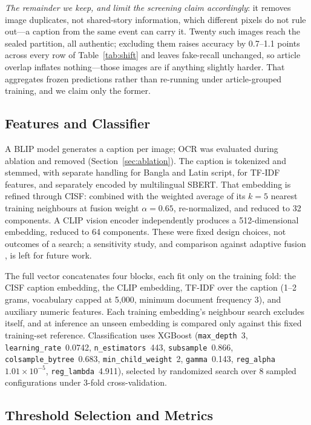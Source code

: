 \documentclass[conference,a4paper]{IEEEtran}
\begin{document}
\emph{The remainder we keep, and limit the screening claim accordingly}: it
removes image duplicates, not shared-story information, which different pixels
do not rule out---a caption from the same event can carry it. Twenty such
images reach the sealed partition, all authentic; excluding them raises
accuracy by 0.7--1.1 points across every row of Table~\ref{tab:shift} and
leaves fake-recall unchanged, so article overlap inflates nothing---those
images are if anything slightly harder. That aggregates frozen predictions
rather than re-running under article-grouped training, and we claim only the
former.

\subsection{Features and Classifier}
\label{sec:features}

A BLIP model generates a caption per image; OCR was evaluated during ablation
and removed (Section~\ref{sec:ablation}). The caption is tokenized and stemmed,
with separate handling for Bangla and Latin script, for TF-IDF features, and
separately encoded by multilingual SBERT. That embedding is refined through
CISF: combined with the weighted average of its $k=5$ nearest training
neighbours at fusion weight $\alpha=0.65$, re-normalized, and reduced to 32
components. A CLIP vision encoder independently produces a
512-dimensional embedding, reduced to 64 components. These were fixed design
choices, not outcomes of a search; a sensitivity study, and comparison against
adaptive fusion \cite{mmfusionnet,claaf}, is left for future work.

The full vector concatenates four blocks, each fit only on the training fold:
the CISF caption embedding, the CLIP embedding, TF-IDF over the caption (1--2
grams, vocabulary capped at 5{,}000, minimum document frequency 3), and
auxiliary numeric features. Each training embedding's neighbour search excludes
itself, and at inference an unseen embedding is compared only against this
fixed training-set reference. Classification uses XGBoost
(\texttt{max\_depth}~3, \texttt{learning\_rate}~0.0742,
\texttt{n\_estimators}~443, \texttt{subsample}~0.866,
\texttt{colsample\_bytree}~0.683, \texttt{min\_child\_weight}~2,
\texttt{gamma}~0.143, \texttt{reg\_alpha}~$1.01\times10^{-5}$,
\texttt{reg\_lambda}~4.911), selected by randomized search over 8 sampled
configurations under 3-fold cross-validation.

\subsection{Threshold Selection and Metrics}
\label{sec:training}
\end{document}
